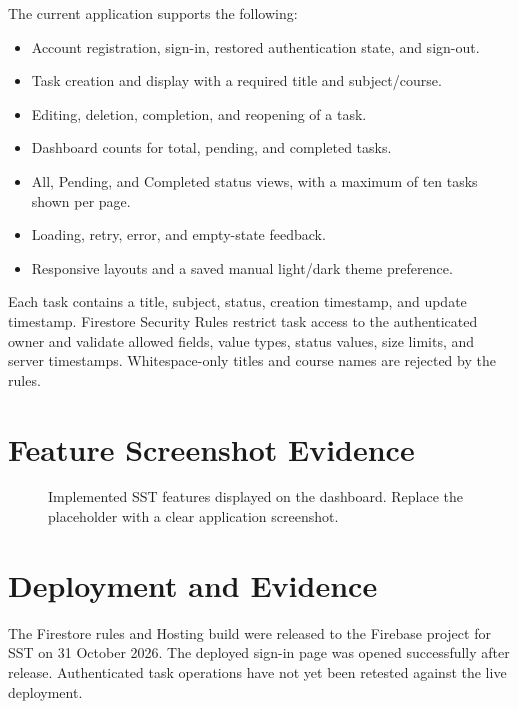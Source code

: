 \documentclass[11pt,a4paper]{article}
\begin{document}
The current application supports the following:
\begin{itemize}
  \item Account registration, sign-in, restored authentication state, and sign-out.
  \item Task creation and display with a required title and subject/course.
  \item Editing, deletion, completion, and reopening of a task.
  \item Dashboard counts for total, pending, and completed tasks.
  \item All, Pending, and Completed status views, with a maximum of ten tasks shown per page.
  \item Loading, retry, error, and empty-state feedback.
  \item Responsive layouts and a saved manual light/dark theme preference.
\end{itemize}

Each task contains a title, subject, status, creation timestamp, and update timestamp. Firestore Security Rules restrict task access to the authenticated owner and validate allowed fields, value types, status values, size limits, and server timestamps. Whitespace-only titles and course names are rejected by the rules.

\section{Feature Screenshot Evidence}

\begin{figure}[htbp]
  \centering
  \caption{Implemented SST features displayed on the dashboard. Replace the placeholder with a clear application screenshot.}
  \label{fig:sst-dashboard}
\end{figure}

\section{Deployment and Evidence}

The Firestore rules and Hosting build were released to the Firebase project for SST on 31 October 2026. The deployed sign-in page was opened successfully after release. Authenticated task operations have not yet been retested against the live deployment.
\end{document}
